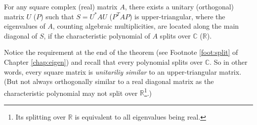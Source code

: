 \begin{thm}
\label{thm:schurtrig}
For any square complex (real) matrix $A$, there exists a unitary (orthogonal) matrix $U$ ($P$) such that $S = U^*AU$ ($P^TAP$) is upper-triangular, where the eigenvalues of $A$, counting algebraic multiplicities, are located along the main diagonal of $S$, if the characteristic polynomial of $A$ splits over $\mathbb{C}$ ($\mathbb{R}$).
\end{thm}
Notice the requirement at the end of the theorem (see Footnote \ref{foot:split} of Chapter \ref{chap:eigen}) and recall that every polynomial splits over $\mathbb{C}$. So in other words, every square matrix is \textit{unitariliy similar} to an upper-triangular matrix. (But not always orthogonally similar to a real diagonal matrix as the characteristic polynomial may not split over $\mathbb{R}$\footnote{Its splitting over $\mathbb{R}$ is equivalent to all eigenvalues being real.}.)
